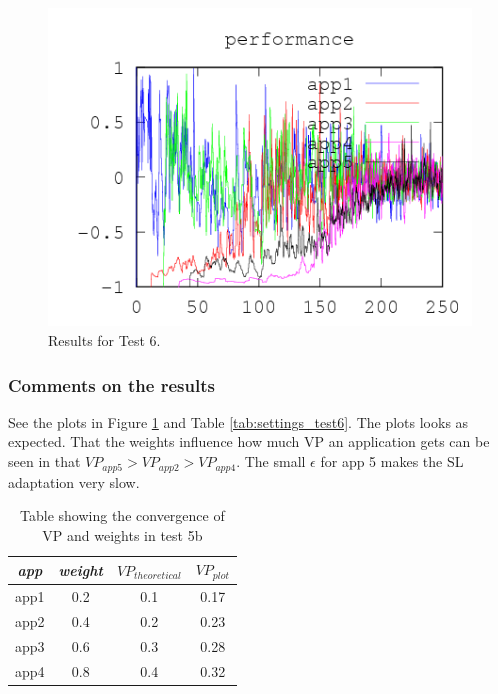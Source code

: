 \documentclass[nobiblatex]{LTHthesis}
\begin{document}
\begin{figure}[th]
\begin{minipage}{0.49\textwidth}
  \includegraphics[width=\textwidth]{"tools/plot/logs/test6/f"}
  \end{minipage}
\caption{Results for Test 6.}
\label{fig:test6}
\end{figure}


\subsubsection{Comments on the results}
See the plots in Figure \ref{fig:test6} and Table \ref{tab:settings_test6}.
The plots looks as expected. That the weights influence how much VP an
application gets can be seen in that $VP_{app5}>VP_{app2}>VP_{app4}$. 
The small $\epsilon$ for app 5 makes the SL adaptation very slow.


\begin{table}[h]
  \centering
  \begin{tabular}{|c|c|c|c|}
 	\hline 
   \emph{app} & \emph{weight} & $VP_{theoretical}$ & $VP_{plot}$  \\ \hline
	app1 & 0.2 & 0.1 & 	0.17	\\ \hline
	app2 & 0.4 & 0.2 & 	0.23 \\ \hline
	app3 & 0.6 & 0.3 & 	0.28 \\ \hline
	app4 & 0.8 & 0.4 &  0.32 \\ \hline
  \end{tabular}
  \caption{Table showing the convergence of VP and weights in test 5b}
  \label{tab:VP_test5b}
\end{table}

\end{document}
